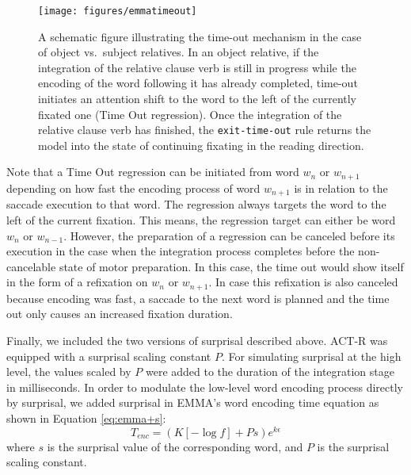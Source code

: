 \begin{figure}[!htbp]
\begin{center}
\texttt{[image: figures/emmatimeout]}
\end{center}
\caption{A schematic figure illustrating the time-out mechanism in the case of object vs.\ subject relatives. In an object relative, if the integration of the relative clause verb is still in progress while the encoding of the word following it has already completed, time-out initiates an attention shift to the word to the left of the currently fixated one (Time Out regression).  Once the integration of the relative clause verb has finished, the \texttt{exit-time-out} rule returns the model into the state of continuing fixating in the reading direction.}
\label{fig:timeout}
\end{figure}


Note that a Time Out regression can be initiated from word $w_{n}$ or $w_{n+1}$ depending on how fast the encoding process of word $w_{n+1}$ is in relation to the saccade execution to that word.  The regression always targets the word to the left of the current fixation.  This means, the regression target can either be word $w_{n}$ or  $w_{n-1}$.  However, the preparation of a regression can be canceled before its execution in the case when the integration process completes before the non-cancelable state of motor preparation.  In this case, the time out would show itself in the form of a refixation on $w_{n}$ or $w_{n+1}$.  In case this refixation is also canceled because encoding was fast, a saccade to the next word is planned and the time out only causes an increased fixation duration.

Finally, we included the two versions of surprisal described above.  ACT-R was equipped with a surprisal scaling constant $P$. 
For simulating surprisal at the high level, the values scaled by $P$ were added to the duration of the integration stage in milliseconds.  In order to modulate the low-level word encoding process directly by surprisal, we added surprisal in EMMA's word encoding time equation as shown in Equation \ref{eq:emma+s}:
\begin{equation}
T_{enc} = (K [-\log{f}] + Ps)e^{k\epsilon}
\label{eq:emma+s}
\end{equation}
where $s$ is the surprisal value of the corresponding word, and $P$ is the surprisal scaling constant.

